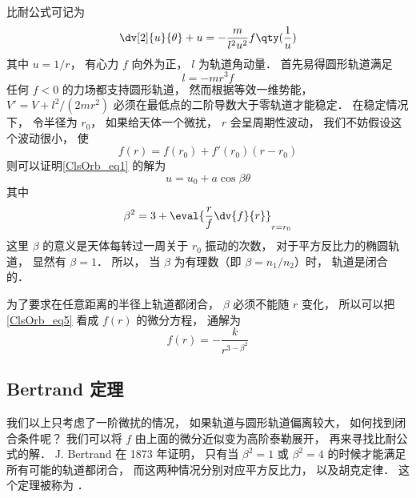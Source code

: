 

比耐公式可记为
\begin{equation}\label{ClsOrb_eq1}
\dv[2]{u}{\theta} + u = -\frac{m}{l^2 u^2} f\qty(\frac 1u)
\end{equation}
其中 $u = 1/r$， 有心力 $f$ 向外为正， $l$ 为轨道角动量． 首先易得圆形轨道满足
\begin{equation}
l = - m r^3 f
\end{equation}
任何 $f < 0$ 的力场都支持圆形轨道， 然而根据等效一维势能， $V' = V + l^2/(2mr^2)$ 必须在最低点的二阶导数大于零轨道才能稳定． 在稳定情况下， 令半径为 $r_0$， 如果给天体一个微扰， $r$ 会呈周期性波动， 我们不妨假设这个波动很小， 使
\begin{equation}
f(r) = f(r_0) + f'(r_0)(r-r_0)
\end{equation}
则可以证明\autoref{ClsOrb_eq1} 的解为
\begin{equation}
u = u_0 + a\cos\beta\theta
\end{equation}
其中
\begin{equation}\label{ClsOrb_eq5}
\beta^2 = 3 + \eval{\frac rf \dv{f}{r}}_{r = r_0}
\end{equation}
这里 $\beta$ 的意义是天体每转过一周关于 $r_0$ 振动的次数， 对于平方反比力的椭圆轨道， 显然有 $\beta = 1$． 所以， 当 $\beta$ 为有理数（即 $\beta = n_1/n_2$）时， 轨道是闭合的．

为了要求在任意距离的半径上轨道都闭合，  $\beta$ 必须不能随 $r$ 变化， 所以可以把\autoref{ClsOrb_eq5} 看成 $f(r)$ 的微分方程， 通解为
\begin{equation}
f(r) = - \frac{k}{r^{3-\beta^2}}
\end{equation}

\subsection{Bertrand 定理}
我们以上只考虑了一阶微扰的情况， 如果轨道与圆形轨道偏离较大， 如何找到闭合条件呢？ 我们可以将 $f$ 由上面的微分近似变为高阶泰勒展开， 再来寻找比耐公式的解． J. Bertrand 在 1873 年证明， 只有当 $\beta^2 = 1$ 或 $\beta^2 = 4$ 的时候才能满足所有可能的轨道都闭合， 而这两种情况分别对应平方反比力， 以及胡克定律． 这个定理被称为 ．